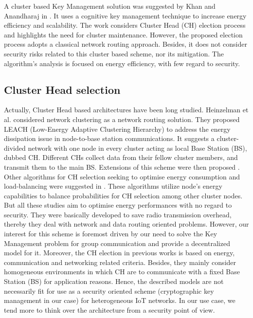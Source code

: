A cluster based Key Management solution was suggested by Khan and Anandharaj in \cite{feroz_khan_cognitive_2019}. It uses a cognitive key management technique to increase energy efficiency and scalability. The work considers Cluster Head (CH) election process and highlights the need for cluster maintenance. However, the proposed election process adopts a classical network routing approach. Besides, it does not consider security risks related to this cluster based scheme, nor its mitigation. The algorithm’s analysis is focused on energy efficiency, with few regard to security.

\subsection{Cluster Head selection}
\label{subsec:ch}

Actually, Cluster Head based architectures have been long studied. Heinzelman et al. \cite{heinzelman_energy-efcient_2000} considered network clustering as a network routing solution. They proposed LEACH (Low-Energy Adaptive Clustering Hierarchy) to address the energy dissipation issue in node-to-base station communications. It suggests a cluster-divided network with one node in every cluster acting as local Base Station (BS), dubbed CH. Different CHs collect data from their fellow cluster members, and transmit them to the main BS. Extensions of this scheme were then proposed \cite{al-baz_new_2018, kang_distance_2012}. Other algorithms for CH selection seeking to optimise energy consumption and load-balancing were suggested in \cite{behera_residual_2019, jia_dynamic_2016}. These algorithms utilize node’s energy capabilities to balance probabilities for CH selection among other cluster nodes. But all these studies aim to optimise energy performances with no regard to security. They were basically developed to save radio transmission overhead, thereby they deal with network and data routing oriented problems. However, our interest for this scheme is foremost driven by our need to solve the Key Management problem for group communication and provide a decentralized model for it. Moreover, the CH election in previous works is based on energy, communication and networking related criteria. Besides, they mainly consider homogeneous environments in which CH are to communicate with a fixed Base Station (BS) for application reasons. Hence, the described models are not necessarily fit for use as a security oriented scheme (cryptographic key management in our case) for heterogeneous IoT networks. In our use case, we tend more to think over the architecture from a security point of view.

